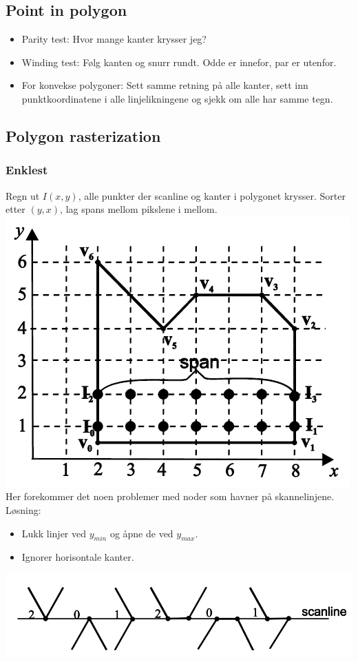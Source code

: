 \subsection{Point in polygon}
\begin{itemize}
    \item Parity test: Hvor mange kanter krysser jeg?
    \item Winding test: Følg kanten og snurr rundt. Odde er innefor, par er utenfor.
    \item For konvekse polygoner: Sett samme retning på alle kanter, sett inn punktkoordinatene i alle linjelikningene og sjekk om alle har samme tegn.
\end{itemize}

\subsection{Polygon rasterization}
\subsubsection{Enklest}
Regn ut $I(x,y)$, alle punkter der scanline og kanter i polygonet krysser. Sorter etter $(y,x)$, lag spans mellom pikslene i mellom.
\\ \includegraphics[width=\textwidth]{Bilder/scanline.png}
Her forekommer det noen problemer med noder som havner på skannelinjene. Løsning:
\begin{itemize}
    \item Lukk linjer ved $y_{min}$ og åpne de ved $y_{max}$.
    \item Ignorer horisontale kanter.
\end{itemize}
\includegraphics[width=\textwidth]{Bilder/scanline2.png}

